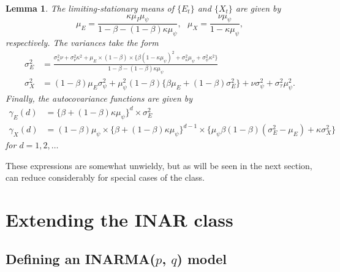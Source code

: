 \documentclass{article}
\newtheorem{lemma}{Lemma}
\begin{document}
\begin{lemma}
The limiting-stationary means of $\{E_t\}$ and $\{X_t\}$ are given by
$$
\mu_E = \frac{\kappa\mu_I\mu_\psi}{1 - \beta - (1 - \beta)\kappa\mu_\psi}, \ \ \ \mu_X = \frac{\nu\mu_\psi}{1 - \kappa\mu_\psi},
$$
respectively. The variances take the form
\begin{align*}
\sigma^2_E & = \frac{\sigma^2_\kappa \nu + \sigma^2_\nu\kappa^2 + \mu_E \times (1 - \beta) \times \{\beta (1 - \kappa\mu_\psi)^2 + \sigma^2_\kappa\mu_\psi + \sigma^2_\psi\kappa^2\}}{1 - \beta - (1 - \beta)\kappa\mu_\psi}\\
\sigma^2_X & = (1 - \beta)\mu_E \sigma^2_\psi + \mu_\psi^2(1 - \beta)\{\beta\mu_E + (1 - \beta)\sigma^2_E\} +
  \nu\sigma^2_\psi + \sigma^2_\tau\mu_\psi^2.
\end{align*}
Finally, the autocovariance functions are given by
\begin{align*}
\gamma_E(d) & = \{\beta + (1 - \beta)\kappa\mu_\psi\}^d \times \sigma^2_E\\
\gamma_X(d) & = (1 - \beta)\mu_\psi\times \{\beta + (1 - \beta)\kappa\mu_\psi\}^{d - 1} \times \{\mu_\psi\beta(1 - \beta)(\sigma^2_E - \mu_E) + \kappa\sigma^2_X\}
\end{align*}
for $d = 1, 2, \dots$
\end{lemma}
These expressions are somewhat unwieldy, but as will be seen in the next section, can reduce considerably for special cases of the class.


\section{Extending the INAR class}
\label{sec:extension_inar}

\subsection{Defining an INARMA($p$, $q$) model}
\end{document}
